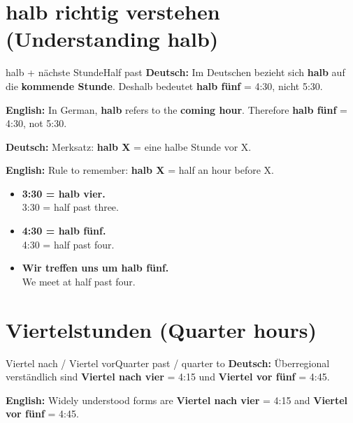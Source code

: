 \documentclass[a4paper,11pt]{article}
\newcommand{\GermanText}[1]{\textbf{Deutsch: }#1\par}
\newcommand{\EnglishText}[1]{{\small\color{SoftGray}\textbf{English: }#1\par}}
\newcommand{\ExampleItem}[2]{\item \textbf{#1}\\{\small\color{SoftGray}#2}}
\begin{document}
\section{halb richtig verstehen \textnormal{(Understanding halb)}}
\begin{grammarentry}{halb + nächste Stunde}{Half past}
\GermanText{Im Deutschen bezieht sich \textbf{halb} auf die \textbf{kommende Stunde}. Deshalb bedeutet \textbf{halb fünf} = 4:30, nicht 5:30.}
\EnglishText{In German, \textbf{halb} refers to the \textbf{coming hour}. Therefore \textbf{halb fünf} = 4:30, not 5:30.}
\GermanText{Merksatz: \textbf{halb X} = eine halbe Stunde vor X.}
\EnglishText{Rule to remember: \textbf{halb X} = half an hour before X.}
\end{grammarentry}
\begin{exbox}\begin{itemize}
\ExampleItem{3:30 = halb vier.}{3:30 = half past three.}
\ExampleItem{4:30 = halb fünf.}{4:30 = half past four.}
\ExampleItem{Wir treffen uns um halb fünf.}{We meet at half past four.}
\end{itemize}\end{exbox}
\section{Viertelstunden \textnormal{(Quarter hours)}}
\begin{grammarentry}{Viertel nach / Viertel vor}{Quarter past / quarter to}
\GermanText{Überregional verständlich sind \textbf{Viertel nach vier} = 4:15 und \textbf{Viertel vor fünf} = 4:45.}
\EnglishText{Widely understood forms are \textbf{Viertel nach vier} = 4:15 and \textbf{Viertel vor fünf} = 4:45.}
\end{grammarentry}
\end{document}
